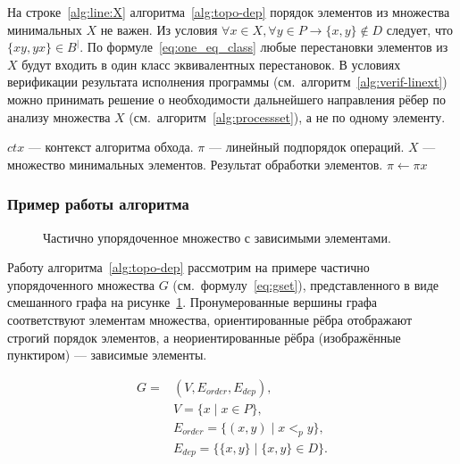 На строке~\ref{alg:line:X} алгоритма~\ref{alg:topo-dep} порядок
элементов из множества минимальных $X$ не важен. Из условия $\forall
x \in X, \forall y \in P \rightarrow \{x, y\} \not \in D$ следует,
что $\{xy, yx\} \in B^{|}$. По формуле~\eqref{eq:one_eq_class} любые
перестановки элементов из $X$ будут входить в один класс
эквивалентных перестановок. В условиях верификации результата
исполнения программы (см.~алгоритм~\ref{alg:verif-linext}) можно
принимать решение о необходимости дальнейшего направления рёбер по
анализу множества $X$ (см.~алгоритм~\ref{alg:processset}), а не по
одному элементу.

\begin{algorithm}[H]
  \caption{Обработка множества минимальных элементов}
  \label{alg:processset}
  \begin{algorithmic}[1]
    \Require $ctx$ — контекст алгоритма обхода.
    \Require $\pi$ — линейный подпорядок операций.
    \Require $X$ — множество минимальных элементов.
    \Ensure Результат обработки элементов.
    \State \Return {} 
    \EndIf
    \State $\pi \gets \pi x$
    \EndFor
    \State \Return {} 
    \EndFunction
  \end{algorithmic}
\end{algorithm}

\subsubsection{Пример работы алгоритма}

\begin{figure}[ht]
  \centerfloat{
    
  }
  \caption{Частично упорядоченное множество с зависимыми элементами.}
  \label{fig:topo-dep}
\end{figure}

Работу алгоритма~\ref{alg:topo-dep} рассмотрим на примере частично
упорядоченного множества $G$ (см.~формулу~\ref{eq:gset}),
представленного в
виде смешанного графа на рисунке~\ref{fig:topo-dep}. Пронумерованные
вершины графа соответствуют элементам множества, ориентированные
рёбра отображают строгий порядок элементов, а неориентированные рёбра
(изображённые пунктиром) — зависимые элементы.

\begin{equation}
  \label{eq:gset}
  \begin{aligned}
    G = &(V, E_{order}, E_{dep}), \\
    &V = \{x \mid x \in P\}, \\
    &E_{order} = \{(x, y) \mid x <_{p} y\}, \\
    &E_{dep} = \{\{x, y\} \mid \{x, y\} \in D\}.
  \end{aligned}
\end{equation}

